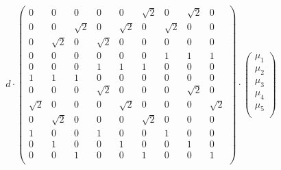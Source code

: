         \begin{equation}
            d\cdot
            \begin{pmatrix}
                 0       &     0     &    0      &      0     &        0    & \sqrt{2} &    0      &  \sqrt{2} &           0 \\
                 0       &     0     &  \sqrt{2} &      0     &    \sqrt{2} &    0     &  \sqrt{2} &     0     &           0 \\
                 0       &  \sqrt{2} &    0      &   \sqrt{2} &        0    &    0     &    0      &     0     &           0 \\
                 0       &     0     &    0      &      0     &        0    &    0     &    1      &     1     &           1 \\
                 0       &     0     &    0      &      1     &        1    &    1     &    0      &     0     &           0 \\
                 1       &     1     &    1      &      0     &        0    &    0     &    0      &     0     &           0 \\
                 0       &     0     &    0      &   \sqrt{2} &        0    &    0     &    0      &  \sqrt{2} &           0 \\
              \sqrt{2}   &     0     &    0      &      0     &    \sqrt{2} &    0     &    0      &     0     &    \sqrt{2} \\
                 0       & \sqrt{2}  &    0      &      0     &        0    & \sqrt{2} &    0      &     0     &           0 \\
                 1       &     0     &    0      &      1     &        0    &    0     &    1      &     0     &           0 \\
                 0       &     1     &    0      &      0     &        1    &    0     &    0      &     1     &           0 \\
                 0       &     0     &    1      &      0     &        0    &    1     &    0      &     0     &           1 \\   
             \end{pmatrix}
             \cdot
             \begin{pmatrix}
                \mu_1\\
                \mu_2\\
                \mu_3\\
                \mu_4\\
                \mu_5\\

\end{pmatrix}
\end{equation}
